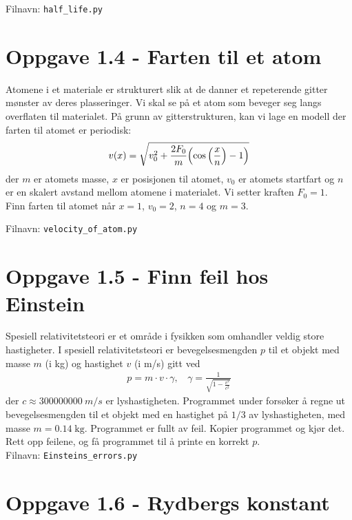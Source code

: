 \documentclass[10pt,a4paper]{article}
\begin{document}
Filnavn: \texttt{half\_life.py}
 
 
 
	\section*{Oppgave 1.4 - Farten til et atom}
	Atomene i et materiale er strukturert slik at de danner et repeterende gitter mønster av deres plasseringer. 
	Vi skal se på et atom som beveger seg langs overflaten til materialet. På grunn av gitterstrukturen, kan vi lage en modell der farten til atomet er periodisk:
	\begin{equation*}
		v(x) = \sqrt{v_0^2 + \frac{2F_0}{m}\qty(\cos\qty(\frac{x}{n}) -1 )}
	\end{equation*}
	der $m$ er atomets masse, $x$ er posisjonen til atomet, $v_0$ er atomets startfart og $n$ er en skalert avstand mellom atomene i materialet. Vi setter kraften $F_0 = 1$.\\
	Finn farten til atomet når $x = 1$, $v_0 = 2$, $n = 4$ og $m = 3$.
	
	Filnavn: \texttt{velocity\_of\_atom.py}
 
\section*{Oppgave 1.5 - Finn feil hos Einstein}
Spesiell relativitetsteori er et område i fysikken som omhandler veldig store hastigheter. I spesiell relativitetsteori er bevegelsesmengden $p$ til et objekt med masse $m$ (i kg) og hastighet $v$ (i m/s) gitt ved
\begin{align*}
p = m\cdot v\cdot \gamma, \ \ \ \ \gamma = \frac{1}{\sqrt{1-\frac{v^2}{c^2}}}
\end{align*}
der $c\approx \SI{300000000}{m/s}$ er lyshastigheten. Programmet under forsøker å regne ut bevegelsesmengden til et objekt med en hastighet på $1/3$ av lyshastigheten, med masse $m=0.14\;\mathrm{kg}$. Programmet er fullt av feil. Kopier programmet og kjør det. Rett opp feilene, og få programmet til å printe en korrekt $p$.
\\

 
Filnavn: \texttt{Einsteins\_errors.py}
 
\section*{Oppgave 1.6 - Rydbergs konstant}
\end{document}
